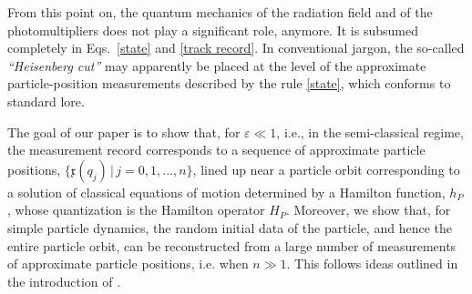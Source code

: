\documentclass[12pt]{article}
\begin{document}
From this point on, the quantum mechanics of the radiation field and of the photomultipliers does not play a significant 
role, anymore. It is subsumed completely in Eqs.~\eqref{state} and \eqref{track record}. In conventional jargon, the 
so-called \textit{``Heisenberg cut''} may apparently be placed at the level of the approximate particle-position 
measurements described by the rule \eqref{state}, which conforms to standard lore.

The goal of our paper is to show that, for $\varepsilon \ll 1$, i.e., in the semi-classical regime, 
the measurement record corresponds to a sequence of approximate particle positions, 
$\big\{\mathfrak{x}(q_j)\,\big|\, j=0,1,...,n\big\}$, lined up near a particle orbit corresponding to a solution of
classical equations of motion determined by a Hamilton function, $h_P$, whose quantization is the Hamilton 
operator $H_P$. Moreover, we show that, for simple particle dynamics, the random initial data of the particle, and 
hence the entire particle orbit, can be reconstructed from a large number of measurements of approximate particle 
positions, i.e. when $n \gg 1$. This follows ideas outlined in the introduction of \cite{BBFF}. 
\end{document}
